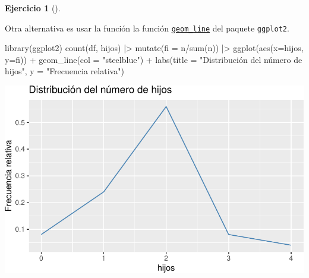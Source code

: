 \documentclass[
  a4paper,
]{scrreport}
\newenvironment{Shaded}{\begin{snugshade}}{\end{snugshade}}
\newcommand{\AttributeTok}[1]{\textcolor[rgb]{0.40,0.45,0.13}{#1}}
\newcommand{\FunctionTok}[1]{\textcolor[rgb]{0.28,0.35,0.67}{#1}}
\newcommand{\NormalTok}[1]{\textcolor[rgb]{0.00,0.23,0.31}{#1}}
\newcommand{\SpecialCharTok}[1]{\textcolor[rgb]{0.37,0.37,0.37}{#1}}
\newcommand{\StringTok}[1]{\textcolor[rgb]{0.13,0.47,0.30}{#1}}
\theoremstyle{definition}
\newtheorem{exercise}{Ejercicio}[chapter]
\theoremstyle{remark}
\begin{document}
\begin{exercise}[]
\begin{enumerate}
  \begin{tcolorbox}[enhanced jigsaw, toprule=.15mm, rightrule=.15mm, arc=.35mm, colback=white, colbacktitle=quarto-callout-tip-color!10!white, toptitle=1mm, left=2mm, colframe=quarto-callout-tip-color-frame, opacityback=0, breakable, opacitybacktitle=0.6, bottomtitle=1mm, titlerule=0mm, title=\textcolor{quarto-callout-tip-color}{\faLightbulb}\hspace{0.5em}{Solución 2}, bottomrule=.15mm, coltitle=black, leftrule=.75mm]

  Otra alternativa es usar la función la función
  \href{https://aprendeconalf.es/manual-r/07-graficos.html\#diagramas-de-lineas}{\texttt{geom\_line}}
  del paquete \texttt{ggplot2}.

\begin{Shaded}
\begin{Highlighting}[]
\FunctionTok{library}\NormalTok{(ggplot2)}
\FunctionTok{count}\NormalTok{(df, hijos) }\SpecialCharTok{|\textgreater{}} 
    \FunctionTok{mutate}\NormalTok{(}\AttributeTok{fi =}\NormalTok{ n}\SpecialCharTok{/}\FunctionTok{sum}\NormalTok{(n)) }\SpecialCharTok{|\textgreater{}}
    \FunctionTok{ggplot}\NormalTok{(}\FunctionTok{aes}\NormalTok{(}\AttributeTok{x=}\NormalTok{hijos, }\AttributeTok{y=}\NormalTok{fi)) }\SpecialCharTok{+}
    \FunctionTok{geom\_line}\NormalTok{(}\AttributeTok{col =} \StringTok{"steelblue"}\NormalTok{) }\SpecialCharTok{+}
    \FunctionTok{labs}\NormalTok{(}\AttributeTok{title =} \StringTok{"Distribución del número de hijos"}\NormalTok{, }\AttributeTok{y =} \StringTok{"Frecuencia relativa"}\NormalTok{)}
\end{Highlighting}
\end{Shaded}

  \includegraphics{03-frecuencias-graficos_files/figure-pdf/unnamed-chunk-9-1.pdf}

  \end{tcolorbox}
\end{enumerate}

\end{exercise}
\end{document}
